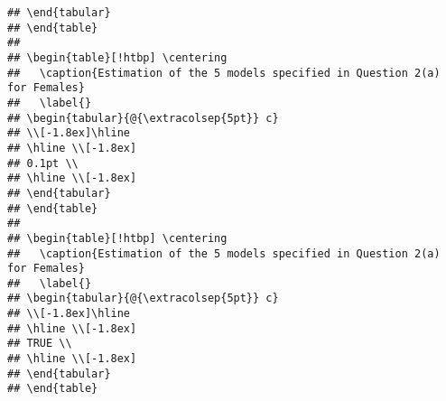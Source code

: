 \documentclass[]{article}
\begin{document}
\begin{verbatim}
## \end{tabular} 
## \end{table} 
## 
## \begin{table}[!htbp] \centering 
##   \caption{Estimation of the 5 models specified in Question 2(a) for Females} 
##   \label{} 
## \begin{tabular}{@{\extracolsep{5pt}} c} 
## \\[-1.8ex]\hline 
## \hline \\[-1.8ex] 
## 0.1pt \\ 
## \hline \\[-1.8ex] 
## \end{tabular} 
## \end{table} 
## 
## \begin{table}[!htbp] \centering 
##   \caption{Estimation of the 5 models specified in Question 2(a) for Females} 
##   \label{} 
## \begin{tabular}{@{\extracolsep{5pt}} c} 
## \\[-1.8ex]\hline 
## \hline \\[-1.8ex] 
## TRUE \\ 
## \hline \\[-1.8ex] 
## \end{tabular} 
## \end{table}
\end{verbatim}
\end{document}
